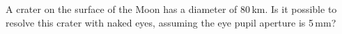 A crater on the surface of the Moon has a diameter of 80\,km. Is it possible to
resolve this crater with naked eyes, assuming the eye pupil aperture is 5\,mm?
